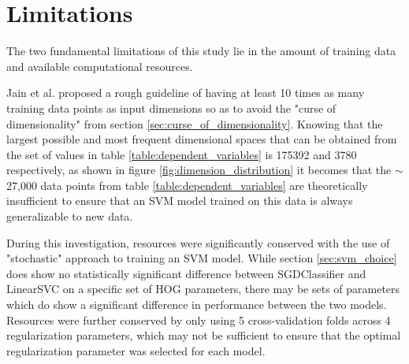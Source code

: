 \section{Limitations}
The two fundamental limitations of this study lie in the amount of training data and available computational resources. 

Jain et al. proposed a rough guideline of having at least 10 times as many training data points as input dimensions \cite{jain_2000_statistical} so as to avoid the "curse of dimensionality" from section \ref{sec:curse_of_dimensionality}. Knowing that the largest possible and most frequent dimensional spaces that can be obtained from the set of values in table \ref{table:dependent_variables} is 175392 and 3780 respectively, as shown in figure \ref{fig:dimension_distribution} it becomes that the $\sim$ 27,000 data points from table \ref{table:dependent_variables} are theoretically insufficient to ensure that an SVM model trained on this data is always generalizable to new data.

During this investigation, resources were significantly conserved with the use of "stochastic" approach to training an SVM model. While section \ref{sec:svm_choice} does show no statistically significant difference between SGDClassifier and LinearSVC on a specific set of HOG parameters, there may be sets of parameters which do show a significant difference in performance between the two models. Resources were further conserved by only using 5 cross-validation folds across 4 regularization parameters, which may not be sufficient to ensure that the optimal regularization parameter was selected for each model.
